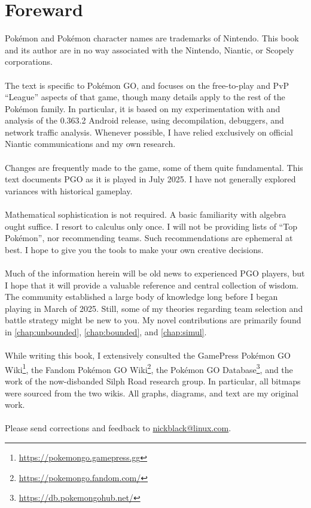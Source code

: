 \clearpage
\chapter{Foreward}

\noindent{}Pokémon and Pokémon character names are trademarks of Nintendo.
This book and its author are in no way associated with the Nintendo, Niantic,
  or Scopely corporations.\\
\\
\noindent{}The text is specific to Pokémon GO, and focuses on the free-to-play and PvP
  ``League'' aspects of that game, though many details
  apply to the rest of the Pokémon family.
In particular, it is based on my experimentation with and analysis of
 the 0.363.2 Android release, using decompilation, debuggers, and
 network traffic analysis.
Whenever possible, I have relied exclusively on official Niantic communications
 and my own research.\\
\\
\noindent{}Changes are frequently made to the game, some of them quite fundamental.
This text documents PGO as it is played in July 2025.
I have not generally explored variances with historical gameplay.\\
\\
\noindent{}Mathematical sophistication is not required.
A basic familiarity with algebra ought suffice.
I resort to calculus only once.
I will not be providing lists of ``Top Pokémon'', nor recommending teams.
Such recommendations are ephemeral at best.
I hope to give you the tools to make your own creative decisions.\\
\\
\noindent{}Much of the information herein will be old news to experienced
 PGO players, but I hope that it will provide a valuable reference and central collection of wisdom.
The community established a large body of knowledge long before I
 began playing in March of 2025.
Still, some of my theories regarding team selection and battle strategy might
  be new to you.
My novel contributions are primarily found in \autoref{chap:unbounded},
  \autoref{chap:bounded}, and \autoref{chap:simul}.\\
\\
\noindent{}While writing this book, I extensively consulted the
  GamePress Pokémon GO Wiki\footnote{\url{https://pokemongo.gamepress.gg}},
  the Fandom Pokémon GO Wiki\footnote{\url{https://pokemongo.fandom.com/}},
  the Pokémon GO Database\footnote{\url{https://db.pokemongohub.net/}},
  and the work of the now-disbanded Silph Road research group.
In particular, all bitmaps were sourced from the two wikis.
All graphs, diagrams, and text are my original work.\\
\\
\noindent{}Please send corrections and feedback to 
  \href{mailto:nickblack@linux.com}{nickblack@linux.com}.
\mainmatter
